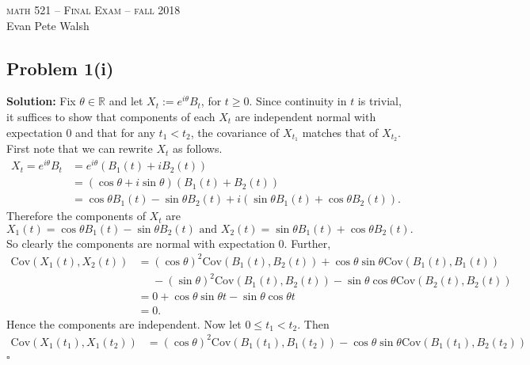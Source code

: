 \documentclass[12pt]{article}
\newcounter{ProofCounter}
\newenvironment{Solution}{\stepcounter{ProofCounter}\textbf{Solution:}}{\hfill$\square$}
\begin{document}
\thispagestyle{empty}
\begin{center}
  \Large \textsc{math 521 -- Final Exam -- fall 2018} \\ 
  \vspace{5mm}
  \large Evan Pete Walsh
\end{center}


\subsection*{Problem 1(i)}
\begin{Solution}
  Fix $\theta \in \mathbb{R}$ and let $X_t := e^{i\theta}B_t$, for $t \geq 0$. Since continuity in $t$ is trivial, it suffices to show that components of each $X_t$ are independent normal with expectation 0 and that for any $t_1 < t_2$, the covariance of $X_{t_1}$ matches that of $X_{t_2}$. First note that we can rewrite $X_t$ as follows.
  \begin{align*}
    X_t = e^{i\theta}B_t & = e^{i\theta}(B_1(t) + i B_2(t)) \\
    & = (\cos \theta + i \sin \theta) (B_1(t) + B_2(t)) \\
    & = \cos \theta B_1(t) - \sin \theta B_2(t) + i (\sin \theta B_1(t) + \cos \theta B_2(t)).
  \end{align*}
  Therefore the components of $X_t$ are 
  \[
    X_1(t) = \cos \theta B_1(t) - \sin \theta B_2(t) \text{ and } X_2(t) = \sin \theta B_1(t) + \cos \theta B_2(t).
  \]
  So clearly the components are normal with expectation 0. Further,
  \begin{align*}
    \text{Cov}(X_1(t), X_2(t)) & = (\cos \theta)^2 \text{Cov}(B_1(t), B_2(t)) + \cos\theta \sin \theta \text{Cov}(B_1(t), B_1(t)) \\
    & \ \ \ \ \ \ - (\sin\theta)^2\text{Cov}(B_1(t), B_2(t)) - \sin\theta\cos\theta \text{Cov}(B_2(t), B_2(t)) \\
    & = 0 + \cos\theta \sin \theta t - \sin\theta\cos\theta t \\
    & = 0.
  \end{align*}
  Hence the components are independent. Now let $0 \leq t_1 < t_2$. Then
  \begin{align*}
    \text{Cov}(X_1(t_1), X_1(t_2)) & = (\cos \theta)^2 \text{Cov}(B_1(t_1), B_1(t_2)) - \cos\theta\sin\theta \text{Cov}(B_1(t_1), B_2(t_2)) \\

\end{align*}
\end{Solution}
\end{document}
